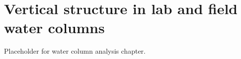 \setchapterpreamble[u]{\margintoc}
\chapter{Vertical structure in lab and field water columns}

Placeholder for water column analysis chapter.
